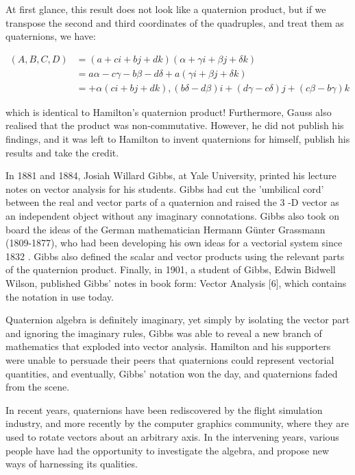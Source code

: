 At first glance, this result does not look like a quaternion product, but if we transpose the second and third coordinates of the quadruples, and treat them as quaternions, we have:

$$
    \begin{aligned}
        (A, B, C, D) & =(a+c i+b j+d k)(\alpha+\gamma i+\beta j+\delta k)                                    \\
                     & =a \alpha-c \gamma-b \beta-d \delta+a(\gamma i+\beta j+\delta k)                      \\
                     & =+\alpha(c i+b j+d k),(b \delta-d \beta) i+(d \gamma-c \delta) j+(c \beta-b \gamma) k
    \end{aligned}
$$

which is identical to Hamilton's quaternion product! Furthermore, Gauss also realised that the product was non-commutative. However, he did not publish his findings, and it was left to Hamilton to invent quaternions for himself, publish his results and take the credit.

In 1881 and 1884, Josiah Willard Gibbs, at Yale University, printed his lecture notes on vector analysis for his students. Gibbs had cut the 'umbilical cord' between the real and vector parts of a quaternion and raised the 3 -D vector as an independent object without any imaginary connotations. Gibbs also took on board the ideas of the German mathematician Hermann Günter Grassmann (1809-1877), who had been developing his own ideas for a vectorial system since 1832 . Gibbs also defined the scalar and vector products using the relevant parts of the quaternion product. Finally, in 1901, a student of Gibbs, Edwin Bidwell Wilson, published Gibbs' notes in book form: Vector Analysis [6], which contains the notation in use today.

Quaternion algebra is definitely imaginary, yet simply by isolating the vector part and ignoring the imaginary rules, Gibbs was able to reveal a new branch of mathematics that exploded into vector analysis. Hamilton and his supporters were unable to persuade their peers that quaternions could represent vectorial quantities, and eventually, Gibbs' notation won the day, and quaternions faded from the scene.

In recent years, quaternions have been rediscovered by the flight simulation industry, and more recently by the computer graphics community, where they are used to rotate vectors about an arbitrary axis. In the intervening years, various people have had the opportunity to investigate the algebra, and propose new ways of harnessing its qualities.

